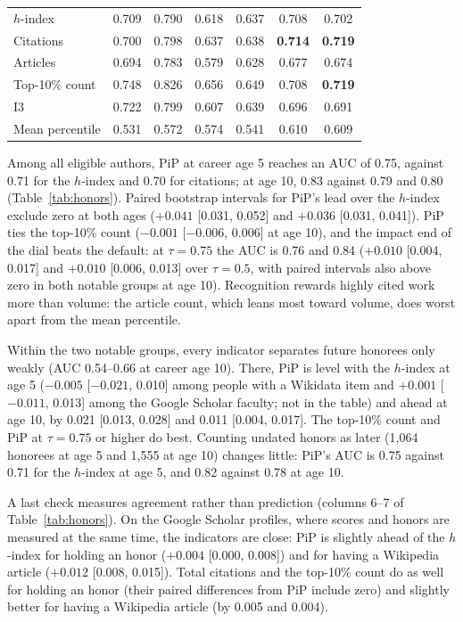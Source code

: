 \documentclass[11pt]{article}
\begin{document}
\begin{table}[t]
\begin{tabular}{lcccccc}
    $h$-index & 0.709 & 0.790 & 0.618 & 0.637 & 0.708 & 0.702 \\
    Citations & 0.700 & 0.798 & 0.637 & 0.638 & \textbf{0.714} & \textbf{0.719} \\
    Articles & 0.694 & 0.783 & 0.579 & 0.628 & 0.677 & 0.674 \\
    Top-10\% count & 0.748 & 0.826 & 0.656 & 0.649 & 0.708 & \textbf{0.719} \\
    I3 & 0.722 & 0.799 & 0.607 & 0.639 & 0.696 & 0.691 \\
    Mean percentile & 0.531 & 0.572 & 0.574 & 0.541 & 0.610 & 0.609 \\
    \bottomrule
  \end{tabular}
\end{table}

Among all eligible authors, PiP at career age 5 reaches an AUC of 0.75, against 0.71 for the $h$-index and 0.70 for
citations; at age 10, 0.83 against 0.79 and 0.80 (Table~\ref{tab:honors}). Paired bootstrap intervals for PiP's lead
over the $h$-index exclude zero at both ages ($+0.041$ [0.031, 0.052] and $+0.036$ [0.031, 0.041]). PiP ties the
top-10\% count ($-0.001$ [$-0.006$, 0.006] at age 10), and the impact end of the dial beats the default: at
$\tau = 0.75$ the AUC is 0.76 and 0.84 ($+0.010$ [0.004, 0.017] and $+0.010$ [0.006, 0.013] over $\tau = 0.5$, with
paired intervals also above zero in both notable groups at age 10). Recognition rewards highly cited work more than
volume: the article count,
which leans most toward volume, does worst apart from the mean percentile.

Within the two notable groups, every indicator separates future honorees only weakly (AUC 0.54--0.66 at career age
10). There, PiP is level with the $h$-index at age 5 ($-0.005$ [$-0.021$, 0.010] among people with a Wikidata item and
$+0.001$ [$-0.011$, 0.013] among the Google Scholar faculty; not in the table) and ahead at age 10, by 0.021 [0.013,
0.028] and 0.011 [0.004, 0.017]. The top-10\% count and PiP at $\tau = 0.75$ or higher do best. Counting undated
honors as later (1,064 honorees at age 5 and 1,555 at age 10) changes little: PiP's AUC is 0.75 against 0.71 for the
$h$-index at age 5, and 0.82 against 0.78 at age 10.

A last check measures agreement rather than prediction (columns 6--7 of Table~\ref{tab:honors}). On the Google Scholar
profiles, where scores and honors are measured at the same time, the indicators are close: PiP is slightly ahead of the
$h$-index for holding an honor ($+0.004$ [0.000, 0.008]) and for having a Wikipedia article ($+0.012$ [0.008, 0.015]).
Total citations and the top-10\% count do as well for holding an honor (their paired differences from PiP include zero)
and slightly better for having a Wikipedia article (by 0.005 and 0.004).
\end{document}
